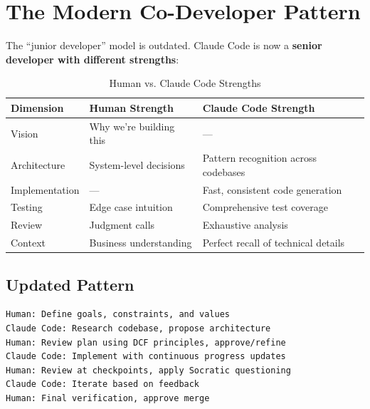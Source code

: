 \chapter{The Modern Co-Developer Pattern}

The ``junior developer'' model is outdated. Claude Code is now a \textbf{senior developer with different strengths}:

\begin{table}[H]
\centering
\begin{tabular}{lll}
\toprule
\textbf{Dimension} & \textbf{Human Strength} & \textbf{Claude Code Strength} \\
\midrule
Vision & Why we're building this & --- \\
Architecture & System-level decisions & Pattern recognition across codebases \\
Implementation & --- & Fast, consistent code generation \\
Testing & Edge case intuition & Comprehensive test coverage \\
Review & Judgment calls & Exhaustive analysis \\
Context & Business understanding & Perfect recall of technical details \\
\bottomrule
\end{tabular}
\caption{Human vs. Claude Code Strengths}
\end{table}

\section{Updated Pattern}

\begin{lstlisting}
Human: Define goals, constraints, and values
Claude Code: Research codebase, propose architecture
Human: Review plan using DCF principles, approve/refine
Claude Code: Implement with continuous progress updates
Human: Review at checkpoints, apply Socratic questioning
Claude Code: Iterate based on feedback
Human: Final verification, approve merge
\end{lstlisting}


